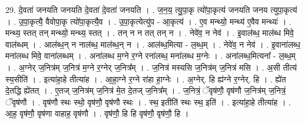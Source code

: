 \documentclass[17pt]{extarticle}
\begin{document}
29. दे॒वता॑ जनयति जनयति दे॒वता॑ दे॒वता॑ जनयति । . ज॒न॒य॒ त्यु॒पा॒कृ त्यो॑पा॒कृत्य॑ जनयति जनय त्युपा॒कृत्य॑ । . उ॒पा॒कृत्यै॒ वैवोपा॒कृ त्यो॑पा॒कृत्यै॒व । . उ॒पा॒कृत्येत्यु॑प - आ॒कृत्य॑ । . ए॒व मन्थ्यो॒ मन्थ्य॑ ए॒वैव मन्थ्यः॑ । . मन्थ्य॒ स्तत् तन् मन्थ्यो॒ मन्थ्य॒ स्तत् । . तन् न न तत् तन् न । . नेवे॑व॒ न नेव॑ । . इ॒वाल॑ब्ध॒ माल॑ब्ध मिवे॒ वाल॑ब्धम् । . आल॑ब्ध॒न् न नाल॑ब्ध॒ माल॑ब्ध॒न् न । . आल॑ब्ध॒मित्या - ल॒ब्ध॒म् । . नेवे॑व॒ न नेव॑ । . इ॒वाना॑लब्ध॒ मना॑लब्ध मिवे॒ वाना॑लब्धम् । . अना॑लब्ध म॒ग्ने र॒ग्ने रना॑लब्ध॒ मना॑लब्ध म॒ग्नेः । . अना॑लब्ध॒मित्यना᳚ - ल॒ब्ध॒म् । . अ॒ग्नेर् ज॒नित्र॑म् ज॒नित्र॑ म॒ग्ने र॒ग्नेर् ज॒नित्र᳚म् । . ज॒नित्र॑ मस्यसि ज॒नित्र॑म् ज॒नित्र॑ मसि । . अ॒सी तीत्य॑ स्य॒सीति॑ । . इत्या॑हा॒हे तीत्या॑ह । . आ॒हा॒ग्ने र॒ग्ने रा॑हा हा॒ग्नेः । . अ॒ग्नेर्. हि ह्य॑ग्ने र॒ग्नेर्. हि । . ह्ये॑त दे॒तद्धि ह्ये॑तत् । . ए॒तज् ज॒नित्र॑म् ज॒नित्र॑ मे॒त दे॒तज् ज॒नित्र᳚म् । . ज॒नित्रं॒ ॅवृष॑णौ॒ वृष॑णौ ज॒नित्र॑म् ज॒नित्रं॒ ॅवृष॑णौ । . वृष॑णौ स्थः स्थो॒ वृष॑णौ॒ वृष॑णौ स्थः । . स्थ॒ इतीति॑ स्थः स्थ॒ इति॑ । . इत्या॑हा॒हे तीत्या॑ह । . आ॒ह॒ वृष॑णौ॒ वृष॑णा वाहाह॒ वृष॑णौ । . वृष॑णौ॒ हि हि वृष॑णौ॒ वृष॑णौ॒ हि । \newline
\end{document}
